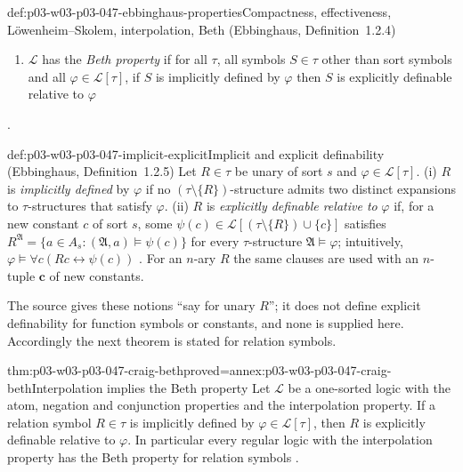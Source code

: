 \begin{hbdefinition}{def:p03-w03-p03-047-ebbinghaus-properties}{Compactness, effectiveness, L\"owenheim--Skolem, interpolation, Beth (Ebbinghaus, Definition~1.2.4)}
\begin{enumerate}
       \emph{interpolation property}) if whenever \(\varphi_i\in\mathscr L[\tau_i]\)
       (\(i=0,1\)) and \(\varphi_0\models\varphi_1\), some
       \(\psi\in\mathscr L[\tau_0\cap\tau_1]\) has
       \(\varphi_0\models\psi\) and \(\psi\models\varphi_1\), provided in the
       many-sorted case that \(\tau_0\cap\tau_1\) contains a sort symbol.
 \item[(ix)] \(\mathscr L\) has the \emph{Beth property} if for all
       \(\tau\), all symbols \(S\in\tau\) other than sort symbols and all
       \(\varphi\in\mathscr L[\tau]\), if \(S\) is implicitly defined by
       \(\varphi\) then \(S\) is explicitly definable relative to \(\varphi\)
\end{enumerate}
\cite[Ch.~II, Definition~1.2.4, pp.~31--32]{Ebbinghaus1985ExtendedLogics}.
\end{hbdefinition}

\begin{hbdefinition}{def:p03-w03-p03-047-implicit-explicit}{Implicit and explicit definability (Ebbinghaus, Definition~1.2.5)}
Let \(R\in\tau\) be unary of sort \(s\) and \(\varphi\in\mathscr L[\tau]\).
(i) \(R\) is \emph{implicitly defined} by \(\varphi\) if no
\((\tau\setminus\{R\})\)-structure admits two distinct expansions to
\(\tau\)-structures that satisfy \(\varphi\).  (ii) \(R\) is \emph{explicitly
definable relative to} \(\varphi\) if, for a new constant \(c\) of sort
\(s\), some \(\psi(c)\in\mathscr L[(\tau\setminus\{R\})\cup\{c\}]\) satisfies
\(R^{\mathfrak A}=\{a\in A_s:(\mathfrak A,a)\models\psi(c)\}\) for every
\(\tau\)-structure \(\mathfrak A\models\varphi\); intuitively,
\(\varphi\models\forall c(Rc\leftrightarrow\psi(c))\)
\cite[Ch.~II, Definition~1.2.5, p.~32]{Ebbinghaus1985ExtendedLogics}.  For
an \(n\)-ary \(R\) the same clauses are used with an \(n\)-tuple
\(\mathbf c\) of new constants.
\end{hbdefinition}

The source gives these notions ``say for unary \(R\)''; it does not define
explicit definability for function symbols or constants, and none is
supplied here.  Accordingly the next theorem is stated for relation symbols.

\begin{hbtheorem}{thm:p03-w03-p03-047-craig-beth}{proved=annex:p03-w03-p03-047-craig-beth}{Interpolation implies the Beth property}
Let \(\mathscr L\) be a one-sorted logic with the atom, negation and
conjunction properties and the interpolation property.  If a relation symbol
\(R\in\tau\) is implicitly defined by \(\varphi\in\mathscr L[\tau]\), then
\(R\) is explicitly definable relative to \(\varphi\).  In particular every
regular logic with the interpolation property has the Beth property for
relation symbols \cite[Ch.~II, \S1.2, p.~32]{Ebbinghaus1985ExtendedLogics}.
\end{hbtheorem}

